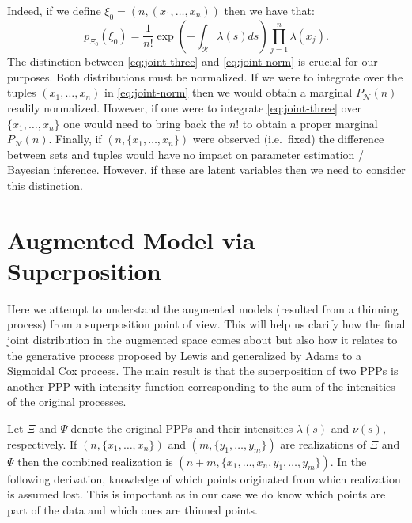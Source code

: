 \documentclass{article}
\newcommand{\calR}{\mathcal{R}}
\newcommand{\ls}{\lambda(s)}
\newcommand{\ns}{\nu(s)}
\begin{document}
	Indeed, if we define  $\xi_0 =(n, (x_1, \ldots, x_n) )$ then we have that:
	\begin{equation}
		\label{eq:joint-norm}
			p_{\Xi_0}(\xi_0) = \frac{1}{n!} \exp\left(-\int_{\calR} \ls ds\right) \prod_{j=1}^{n}  {\lambda(x_j)} \text{.}
	\end{equation}	 
	The distinction between \cref{eq:joint-three} and \cref{eq:joint-norm} is crucial for our purposes. Both distributions must be normalized. 
	If we were to integrate over the tuples $(x_1, \ldots, x_n)$ in \cref{eq:joint-norm} then we would obtain a marginal $P_{\mathcal{N}}(n)$ readily normalized. 
	However, if one were to integrate \cref{eq:joint-three} over $\{x_1, \ldots, x_n \}$ one would need to bring back the $n!$ to obtain a proper marginal $P_{\mathcal{N}}(n)$. 
	Finally, if $( n, \{x_1, \ldots, x_n \})$  were observed (i.e.~fixed) the difference between sets and tuples would have no impact on parameter estimation / Bayesian inference.  However, if these are latent variables then we need to consider this distinction. 
		
	\section{Augmented Model via Superposition}
	Here we attempt to understand the augmented models (resulted from a thinning process) from a superposition point of view. This will help us clarify how the final joint distribution in the augmented space comes about but also how it relates to the generative process proposed by Lewis and generalized by Adams to a Sigmoidal Cox process. The main result is that the superposition of two \glspl{PPP} is another \gls{PPP} with intensity function corresponding to the sum of the intensities of the original processes.
	
	Let $\Xi$ and $\Psi$ denote the original \glspl{PPP} and their intensities $\ls$ and $\ns$, respectively. If $(n, \{x_1, \ldots, x_n\})$ and $(m, \{y_1, \ldots, y_m\})$ are realizations of $\Xi$ and $\Psi$  then the combined realization is $(n + m, \{x_1, \ldots, x_n, y_1, \ldots, y_m \})$.   In the following derivation, {knowledge of which points originated from which realization is assumed lost}. This is important as in our case we do  know which points are part of the data and which ones are thinned points. 
	
\end{document}
